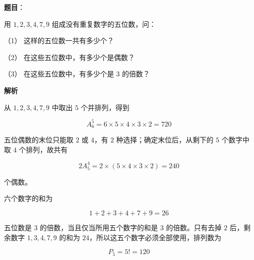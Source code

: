 \begin{answer}

\textbf{题目}：

用 $1,2,3,4,7,9$ 组成没有重复数字的五位数，问：

（1） 这样的五位数一共有多少个？

（2） 在这些五位数中，有多少个是偶数？

（3） 在这些五位数中，有多少个是 $3$ 的倍数？

\textbf{解析}


从 $1,2,3,4,7,9$ 中取出 $5$ 个并排列，得到

\nopagebreak[4]
\[
A_6^5=6\times5\times4\times3\times2=720
\]


五位偶数的末位只能取 $2$ 或 $4$，有 $2$ 种选择；确定末位后，从剩下的 $5$ 个数字中取 $4$ 个排列，故共有

\nopagebreak[4]
\[
2A_5^4=2\times(5\times4\times3\times2)=240
\]

个偶数。


六个数字的和为

\nopagebreak[4]
\[
1+2+3+4+7+9=26
\]

五位数是 $3$ 的倍数，当且仅当所用五个数字的和是 $3$ 的倍数。只有去掉 $2$ 后，剩余数字 $1,3,4,7,9$ 的和为 $24$，所以这五个数字必须全部使用，排列数为

\nopagebreak[4]
\[
P_5=5!=120
\]




\end{answer}
